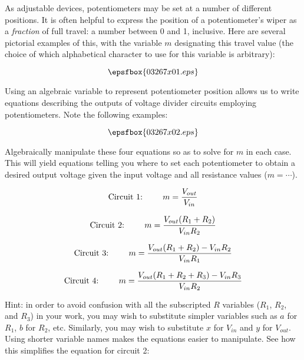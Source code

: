 

As adjustable devices, potentiometers may be set at a number of different positions.  It is often helpful to express the position of a potentiometer's wiper as a {\it fraction} of full travel: a number between 0 and 1, inclusive.  Here are several pictorial examples of this, with the variable $m$ designating this travel value (the choice of which alphabetical character to use for this variable is arbitrary):

$$\epsfbox{03267x01.eps}$$

Using an algebraic variable to represent potentiometer position allows us to write equations describing the outputs of voltage divider circuits employing potentiometers.  Note the following examples:

$$\epsfbox{03267x02.eps}$$

\goodbreak
Algebraically manipulate these four equations so as to solve for $m$ in each case.  This will yield equations telling you where to set each potentiometer to obtain a desired output voltage given the input voltage and all resistance values ($m = \cdots$).







$$\hbox{Circuit 1: \hskip 20pt} m = {V_{out} \over V_{in}}$$

$$\hbox{Circuit 2: \hskip 20pt} m = {{V_{out}(R_1 + R_2)} \over {V_{in} R_2}}$$

$$\hbox{Circuit 3: \hskip 20pt} m = {{{V_{out}(R_1 + R_2)} - V_{in}R_2} \over {V_{in} R_1}}$$

$$\hbox{Circuit 4: \hskip 20pt} m = {{{V_{out}(R_1 + R_2 + R_3)} - V_{in}R_3} \over {V_{in} R_2}}$$

\vskip 10pt

Hint: in order to avoid confusion with all the subscripted $R$ variables ($R_1$, $R_2$, and $R_3$) in your work, you may wish to substitute simpler variables such as $a$ for $R_1$, $b$ for $R_2$, etc.  Similarly, you may wish to substitute $x$ for $V_{in}$ and $y$ for $V_{out}$.  Using shorter variable names makes the equations easier to manipulate.  See how this simplifies the equation for circuit 2:


